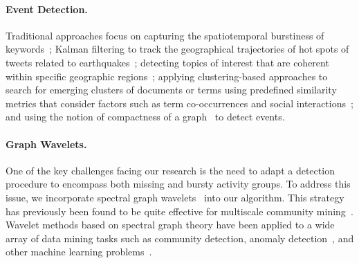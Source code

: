 \paragraph{Event Detection.}
Traditional approaches focus on capturing the spatiotemporal burstiness of keywords~\cite{lappas2009burstiness}; Kalman filtering to track the geographical trajectories of hot spots of tweets related to earthquakes~\cite{sakaki2010earthquake}; detecting topics of interest that are coherent within specific geographic regions~\cite{eisenstein2010latent,hong2012discovering,yin2011geographical}; applying clustering-based approaches to search for emerging clusters of documents or terms using predefined similarity metrics that consider factors such as term co-occurrences and social interactions~\cite{aggarwal2012event,sayyadi2009event,weng2011event}; and using the notion of compactness of a graph~\cite{rozenshtein2014event} to detect events.

\paragraph{Graph Wavelets.}
One of the key challenges facing our research is the need to adapt a detection procedure to encompass both missing and bursty activity groups. To address this issue, we incorporate spectral graph wavelets~\cite{hammond2011wavelets} into our algorithm. This strategy has previously been found to be quite effective for multiscale community mining~\cite{tremblay2014graph}.
Wavelet methods based on spectral graph theory have been applied to a wide array of data mining tasks such as community detection, anomaly detection~\cite{calderara2011detecting}, and other machine learning problems~\cite{shuman_ACHA_2013,ghosh2003wavelet,rustamov2013wavelets,2000wavecluster,silva2016graph}. %


